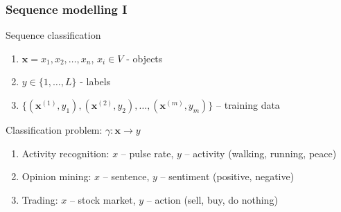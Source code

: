 \documentclass[usenames,dvipsnames,handout,aspectratio=169]{beamer}
\begin{document}
\begin{frame}
\frametitle{Sequence modelling I}

\begin{block}{Sequence classification}

\begin{enumerate}


\item $\bm{x} = x_1,x_2,\ldots,x_n $, $x_i \in V$  - objects
\item $y \in \{1,\ldots, L\}$ - labels 
\item $ \{(\bm{x}^{(1)}, y_1 ), (\bm{x}^{(2)}, y_2 ), \ldots, (\bm{x}^{(m)}, y_m ) \} $ – training data

\end{enumerate}

Classification problem: $ \gamma : \bm{x} \rightarrow y$ 
	
\end{block}

\begin{enumerate}
	\item Activity recognition: $x$ – pulse rate, $y$ – activity (walking, running, peace)
	\item Opinion mining: $x$ – sentence, $y$ – sentiment (positive, negative)
	\item Trading: $x$ – stock market, $y$ – action (sell, buy, do nothing) 
\end{enumerate}

\end{frame}
\end{document}
